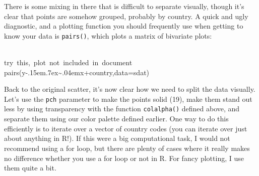\documentclass[a4paper]{article}
\newcommand{\hlcomment}[1]{\textcolor[rgb]{0.8,0.8,0.8}{#1}}%
\newcommand{\hlprompt}[1]{\textcolor[rgb]{0,0,0}{#1}}%
\def\urltilda{\kern -.15em\lower .7ex\hbox{\~{}}\kern .04em}%
\newcommand{\hlstd}[1]{\textcolor[rgb]{0,0,0}{#1}}%
\newenvironment{Houtput}{\raggedright}{%
%
}
\begin{document}
There is some mixing in there that is difficult to separate visually, though it's clear that points are somehow grouped, probably by country. A quick and ugly diagnostic, and a plotting function you should frequently use when getting to know your data is \texttt{pairs()}, which plots a matrix of bivariate plots:

\begin{Houtput}
\hspace*{\fill}\\
\hlstd{}\ttfamily\noindent
\hlprompt{\usebox{\hlnormalsizeboxgreaterthan}{\ }}\hlcomment{\usebox{\hlnormalsizeboxhash}{\ }try{\ }this,{\ }plot{\ }not{\ }included{\ }in{\ }document}\mbox{}
\normalfont
\hspace*{\fill}\\
\hlstd{}\ttfamily\noindent
\hlprompt{\usebox{\hlnormalsizeboxgreaterthan}{\ }}\hlcomment{\usebox{\hlnormalsizeboxhash}{\ }pairs(y\urltilda{}x+country,data=sdat)}\mbox{}
\normalfont
\hspace*{\fill}\\
\hlstd{}
\end{Houtput}

Back to the original scatter, it's now clear how we need to split the data visually. Let's use the \texttt{pch} parameter to make the points solid (19), make them stand out less by using transparency with the function \texttt{colalpha()} defined above, and separate them using our color palette defined earlier. One way to do this efficiently is to iterate over a vector of country codes (you can iterate over just about anything in R!). If this were a big computational task, I would not recommend using a for loop, but there are plenty of cases where it really makes no difference whether you use a for loop or not in R. For fancy plotting, I use them quite a bit. 
\end{document}
